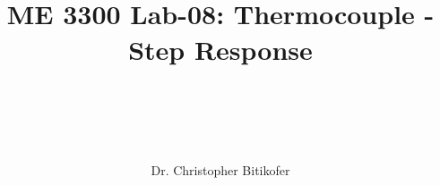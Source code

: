 
\title{
\begin{center}
\HRule \\[0.4cm]
{\Huge \bfseries ME 3300 Lab-08: 
Thermocouple - Step Response \\[0.5cm] 
}\\[0.4cm] %
\HRule \\[1.5cm]
\end{center}
}
\author{\Large Dr. Christopher Bitikofer \\ \\ \\[.1cm]} %
\date{} %

\maketitle
\tableofcontents